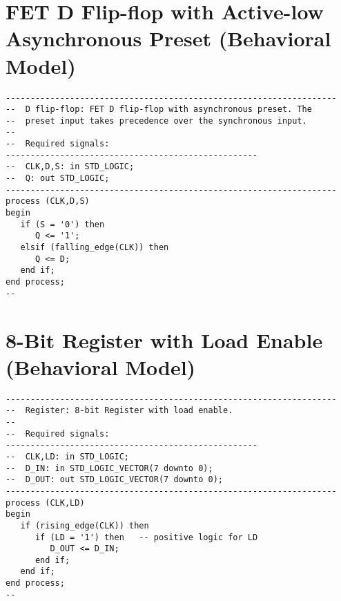 \section{FET D Flip-flop with Active-low Asynchronous Preset (Behavioral Model)}
\noindent
\begin{minipage}{1\linewidth}
\begin{lstlisting}
-------------------------------------------------------------------
--  D flip-flop: FET D flip-flop with asynchronous preset. The 
--  preset input takes precedence over the synchronous input.
--
--  Required signals: 
---------------------------------------------------
--  CLK,D,S: in STD_LOGIC;
--  Q: out STD_LOGIC;
-------------------------------------------------------------------
process (CLK,D,S) 
begin
   if (S = '0') then 
      Q <= '1'; 
   elsif (falling_edge(CLK)) then  
      Q <= D;
   end if;
end process;
--
\end{lstlisting}
\end{minipage}

\section{8-Bit Register with Load Enable (Behavioral Model)}
\noindent
\begin{minipage}{1\linewidth}
\begin{lstlisting}
-------------------------------------------------------------------
--  Register: 8-bit Register with load enable. 
--
--  Required signals: 
---------------------------------------------------
--  CLK,LD: in STD_LOGIC;
--  D_IN: in STD_LOGIC_VECTOR(7 downto 0);
--  D_OUT: out STD_LOGIC_VECTOR(7 downto 0);
-------------------------------------------------------------------
process (CLK,LD) 
begin
   if (rising_edge(CLK)) then  
      if (LD = '1') then   -- positive logic for LD
         D_OUT <= D_IN;
      end if;
   end if;
end process;
--
\end{lstlisting}
\end{minipage}

